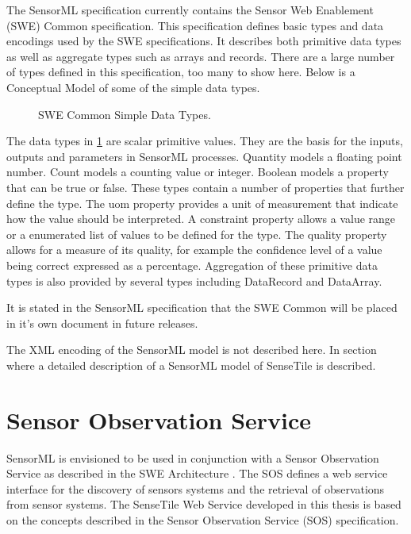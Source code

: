 \documentclass[]{final_report}
\begin{document}
The SensorML specification currently contains the Sensor Web Enablement (SWE) Common specification. This specification defines basic types and data encodings used by the SWE specifications. It describes both primitive data types as well as aggregate types such as arrays and records. There are a large number of types defined in this specification, too many to show here. Below is a Conceptual Model of some of the simple data types.

\begin{figure}[h]
\caption{SWE Common Simple Data Types.}\label{fig:SWESimpleConceptualModel}
\end{figure}

The data types in \ref{fig:SWESimpleConceptualModel} are scalar primitive values. They are the basis for the inputs, outputs and parameters in SensorML processes. Quantity models a floating point number. Count models a counting value or integer.  Boolean models a property that can be true or false. These types contain a number of properties that further define the type. The uom property provides a unit of measurement that indicate how the value should be interpreted.  A constraint property allows a value range or a enumerated list of values to be defined for the type. The quality property allows for a measure of its quality, for example the confidence level of a value being correct expressed as a percentage. Aggregation of these primitive data types is also provided by several types including DataRecord and DataArray.

It is stated in the SensorML specification that the SWE Common will be placed in it's own document in future releases. 

The XML encoding of the SensorML model is not described here. In section where a detailed description of a SensorML model of SenseTile is described.

\section{Sensor Observation Service}
SensorML is envisioned to be used in conjunction with a Sensor Observation Service as described in the SWE Architecture \cite{SWEArchref}. The SOS defines a web service interface for the discovery of sensors systems and the retrieval of observations from sensor systems. The SenseTile Web Service developed in this thesis is based on the concepts described in the Sensor Observation Service (SOS) specification.
\end{document}
